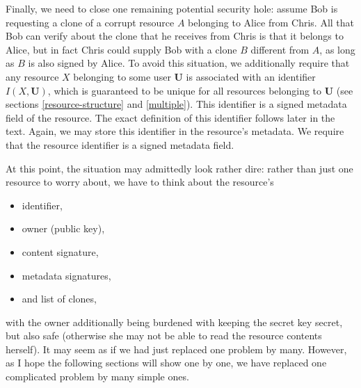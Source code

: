 \documentclass[11pt]{article}
\begin{document}
\begin{mainmatter}
Finally, we need to close one remaining potential security hole: assume Bob is requesting a clone of a corrupt resource $A$ belonging to Alice from Chris. All that Bob can verify about the clone that he receives from Chris is that it belongs to Alice, but in fact Chris could supply Bob with a clone $B$ different from $A$, as long as $B$ is also signed by Alice. To avoid this situation, we additionally require that any resource $X$ belonging to some user $\mathbf U$ is associated with an identifier $I(X, \mathbf U)$, which is guaranteed to be unique for all resources belonging to $\mathbf U$ (see sections \ref{resource-structure} and \ref{multiple}). This identifier is a signed metadata field of the resource. The exact definition of this identifier follows later in the text. Again, we may store this identifier in the resource's metadata. We require that the resource identifier is a signed metadata field.

At this point, the situation may admittedly look rather dire: rather than just one resource to worry about, we have to think about the resource's 
\begin{itemize}
\item identifier, 
\item owner (public key), 
\item content signature,
\item metadata signatures,
\item and list of clones,
\end{itemize} 
with the owner additionally being burdened with keeping the secret key secret, but also safe (otherwise she may not be able to read the resource contents herself). It may seem as if we had just replaced one problem by many. However, as I hope the following sections will show one by one, we have replaced one complicated problem by many simple ones.

\mbox{}\\


\end{mainmatter}
\end{document}
